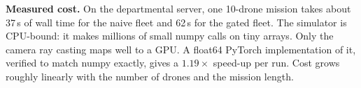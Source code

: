 \textbf{Measured cost.} On the departmental server, one 10-drone mission takes about 37\,s of wall time for the naive
fleet and 62\,s for the gated fleet. The simulator is CPU-bound: it makes millions of small numpy calls on tiny arrays.
Only the camera ray casting maps well to a GPU. A float64 PyTorch implementation of it, verified to match numpy exactly,
gives a $1.19\times$ speed-up per run. Cost grows roughly linearly with the number of drones and the mission length.
